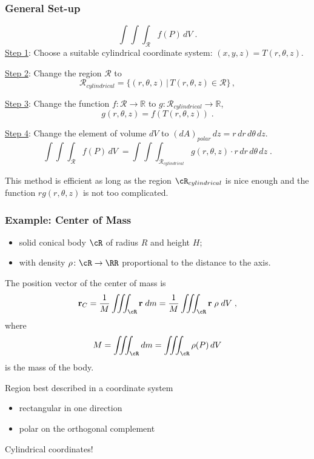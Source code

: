\begin{frame}
    \frametitle{General Set-up}
%
$$\int\!\!\!\int\!\!\!\int_{\mathcal{R}} f(P) \, dV\; .$$
%
\underline{Step 1}: Choose a suitable cylindrical coordinate system: $(x,y,z) = T(r, \theta, z)$.

\underline{Step 2}: Change the region $\mathcal{R}$ to
      $$\mathcal{R}_{cylindrical} = \{(r,\theta,z) \, | \, T(r,\theta,z) \in \mathcal{R} \}\, ,$$

\underline{Step 3}: Change the function $f\colon \mathcal{R} \to \mathbb{R}$ to $g \colon \mathcal{R}_{cylindrical} \to \mathbb{R}$,
      $$g(r,\theta,z) = f(T(r,\theta,z))\; .$$

\underline{Step 4}: Change the element of volume $dV$ to $ (dA)_{polar} \, dz = r \,dr\, d\theta \, dz$.
%
$$\int\!\!\!\int\!\!\!\int_{\mathcal{R}} f(P) \, dV\; = \int\!\!\!\int\!\!\!\int_{\mathcal{R}_{cylindrical}} g(r,\theta,z) \cdot r\,dr\,d\theta\, dz \; .$$

This method is efficient as long as the region $\cR_{cylindrical}$ is nice enough and the function $rg(r,\theta,z)$ is not too complicated.

\end{frame}

\begin{frame}
  \frametitle{Example: Center of Mass}

\begin{itemize}
\item solid conical body $\cR$ of radius $R$ and height $H$;
\item with density $\rho \colon \cR \to \RR$ proportional to the distance to the axis.
\end{itemize}
 
The position vector of the center of mass is
%
$$\textbf{r}_C = \frac{1}{M} \int\!\!\!\int\!\!\!\int_{\cR} \textbf{r} \; dm = \frac{1}{M} \int\!\!\!\int\!\!\!\int_{\cR} \textbf{r} \; \rho \; dV\; ,$$
%
where
%
$$M = \int\!\!\!\int\!\!\!\int_{\cR}  dm = \int\!\!\!\int\!\!\!\int_{\cR}  \rho(P) \, dV$$
%
is the mass of the body.

  Region best described in a coordinate system
  \begin{itemize}
    \item rectangular in one direction
    \item polar on the orthogonal complement
  \end{itemize}
  Cylindrical coordinates!
\end{frame}

